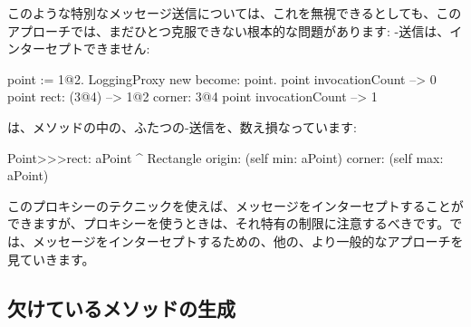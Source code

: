 \documentclass[a4paper,10pt,twoside]{book}
\begin{document}
このような特別なメッセージ送信については、これを無視できるとしても、このアプローチでは、まだひとつ克服できない根本的な問題があります: \self-送信は、インターセプトできません:
\begin{code}{}
point := 1@2.
LoggingProxy new become: point.
point invocationCount --> 0
point rect: (3@4)        --> 1@2 corner: 3@4
point invocationCount --> 1
\end{code}

は、メソッドの中の、ふたつの\self-送信を、数え損なっています: %
\begin{code}{}
Point>>>rect: aPoint 
	^ Rectangle  origin: (self min: aPoint) corner: (self max: aPoint)
\end{code}

このプロキシーのテクニックを使えば、メッセージをインターセプトすることができますが、プロキシーを使うときは、それ特有の制限に注意するべきです。では、メッセージをインターセプトするための、他の、より一般的なアプローチを見ていきます。

\subsection{欠けているメソッドの生成}
\end{document}
